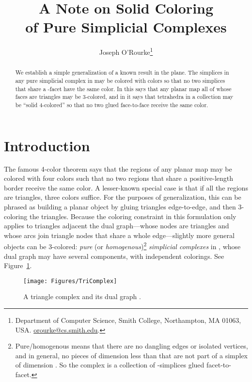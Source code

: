 \pdfoutput=1  \documentclass[]{article}
\title{A Note on Solid Coloring\\of Pure Simplicial Complexes
}
\author{Joseph O'Rourke\thanks{Department of Computer Science, Smith College, Northampton, MA
      01063, USA.
      \protect\url{orourke@cs.smith.edu}.}
}
\newcommand{\figlab}[1]{\label{fig:#1}}
\newcommand{\seclab}[1]{\label{sec:#1}}
\newcommand{\figref}[1]{\ref{fig:#1}}
\begin{document}
\maketitle

\begin{abstract}
We establish a simple generalization of a known result in the plane.
The simplices in any pure simplicial complex in  may be
colored with  colors so that no two simplices that share a
-facet
have the same color.
In  this says that any planar map all of whose faces
are triangles may be 3-colored,
and in  it says that tetrahedra in a collection
may be ``solid 4-colored'' so that no two glued face-to-face receive
the same color.
\end{abstract}

\section{Introduction}
\seclab{Introduction}
The famous 4-color theorem says that the regions of any planar map
may be colored with four colors such that no two regions that share a
positive-length border receive the same color.
A lesser-known special case is that if all the regions are triangles,
three colors suffice.
For the purposes of generalization, this can be phrased as building a
planar
object by gluing triangles edge-to-edge, and then 3-coloring the
triangles.
Because the coloring constraint in this formulation
only applies to triangles adjacent the
dual
graph---whose nodes are triangles and whose arcs join triangle nodes
that share a whole edge---slightly more general objects can be 3-colored:
\emph{pure} (or \emph{homogenous})\footnote{
  Pure/homogenous means that there are no dangling edges or isolated
  vertices, and in general, no pieces of dimension less than  that
  are not part of a simplex of dimension .  So the complex is a
  collection of -simplices glued facet-to-facet.
}
\emph{simplicial complexes}
in , whose dual graph may have several components, with
independent colorings. 
See Figure~\figref{TriComplex}.
\begin{figure}[htbp]
\centering
\texttt{[image: Figures/TriComplex]}
\caption{A triangle complex and its dual graph .}
\figlab{TriComplex}
\end{figure}
\end{document}
